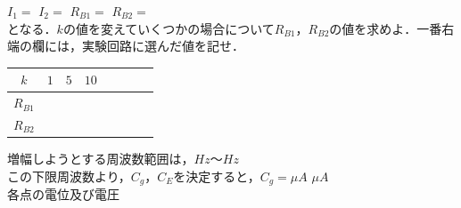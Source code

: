 \documentclass[10pt, a4j, dvipdfmx]{jarticle}
\begin{document}
    \hspace{7mm}$I_1 = $ \underline{\hspace{20mm}}\hspace{7mm}$I_2 = $ \underline{\hspace{20mm}}\hspace{7mm}$R_{B1} = $ \underline{\hspace{20mm}}$R_{B2} = $ \underline{\hspace{20mm}}\\
    となる．$k$の値を変えていくつかの場合について$R_{B1}$，$R_{B2}$の値を求めよ．一番右端の欄には，実験回路に選んだ値を記せ．
    \begin{table}[H]
        \begin{tabular}{||c||c|c|c|c|c|c||c||}
        \hline\hline
        $k$      & $1$           & $5$           & $10$          &               &               &               &               \\ \hline\hline
        $R_{B1}$ & \hspace{15mm} & \hspace{15mm} & \hspace{15mm} & \hspace{15mm} & \hspace{15mm} & \hspace{15mm} & \hspace{15mm} \\ \hline
        $R_{B2}$ &               &               &               &               &               &               &               \\ \hline\hline
        \end{tabular}
    \end{table}
    \newpage
    増幅しようとする周波数範囲は，\hspace{7mm}\underline{\hspace{20mm}}$Hz$〜\hspace{7mm}\underline{\hspace{20mm}}$Hz$\\
    この下限周波数より，$C_g$，$C_E$を決定すると，$C_g = $\underline{\hspace{20mm}}$\mu A$\hspace{7mm} \underline{\hspace{20mm}}$\mu A$\\
    各点の電位及び電圧
\end{document}
